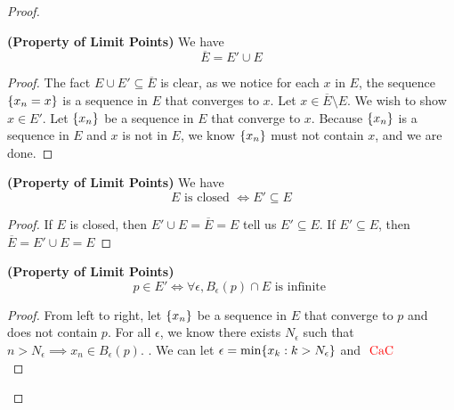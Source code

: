 \documentclass{report}
\begin{document}
\begin{proof}
\begin{definition}
\end{definition}
\begin{theorem}
\label{1.2.7}
\textbf{(Property of Limit Points)} We have
\begin{equation}
\overline{E}=E'\cup E
\end{equation}
\end{theorem}
\begin{proof}
The fact $E\cup E'\subseteq \overline{E}$ is clear, as we notice for each $x$ in $E$, the sequence $\{ x_n=x \}$ is a sequence in $E$ that converges to $x$. Let $x\in \overline{E}\setminus E$. We wish to show $x\in E'$. Let $\{ x_n \}$ be a sequence in $E$ that converge to  $x$. Because $\{ x_n \}$ is a sequence in $E$ and $x$ is not in $E$, we know  $\{ x_n \}$ must not contain $x$, and we are done.
\end{proof}
\begin{corollary}
\label{1.2.8}
\textbf{(Property of Limit Points)} We have
\begin{equation}
E\text{ is closed }\iff  E'\subseteq E
\end{equation}
\end{corollary}
\begin{proof}
If $E$ is closed, then  $E'\cup E=\overline{E}=E$ tell us $E'\subseteq E$. If $E'\subseteq E$, then $\overline{E}=E'\cup E=E$
\end{proof}
\begin{theorem}
\label{1.2.9}
\textbf{(Property of Limit Points)} 
\begin{equation}
p\in E'\iff \forall \epsilon, B_\epsilon (p)\cap E\text{ is infinite }
\end{equation}
\end{theorem}
\begin{proof}
  From left to right, let $\{ x_n \}$ be a sequence in $E$ that converge to $p$ and does not contain  $p$. For all $\epsilon$, we know there exists $N_\epsilon $ such that $n>N_\epsilon \implies x_n\in B_\epsilon (p)$. . We can let $\epsilon=\min \{ x_k:k>N_\epsilon  \}$ and $\text{ \textcolor{red}{CaC} }$\\


\end{proof}
\end{proof}
\end{document}
